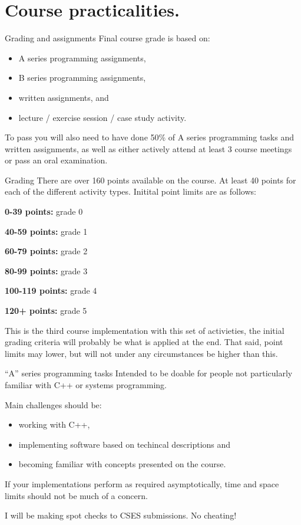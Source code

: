 \documentclass[11pt, aspectratio=169, table]{beamer}
\begin{document}
\section{Course practicalities.}
\begin{frame}{Grading and assignments}
\setlength\parskip{\fill}
Final course grade is based on:
\begin{itemize}
	\item A series programming assignments,
	\item B series programming assignments,
	\item written assignments, and
	\item lecture / exercise session / case study activity.
\end{itemize}

To pass you will also need to have done 50\% of A series programming tasks and written 
assignments, as well as either actively attend at least 3 course meetings or pass an oral 
examination.
\end{frame}

\begin{frame}{Grading}
There are over 160 points available on the course. At least 40 points for each of the different
activity types. Initital point limits are as follows:
\begin{description}
\item{{\bf 0-39 points:}} grade 0
\item{{\bf 40-59 points:}} grade 1
\item{{\bf 60-79 points:}} grade 2
\item{{\bf 80-99 points:}} grade 3
\item{{\bf 100-119 points:}} grade 4
\item{{\bf 120+ points:}} grade 5
\end{description}

This is the third course implementation with this set of activieties, the initial grading criteria 
will probably be what is applied at the end. That said, point limits may lower, but will not under any 
circumstances be higher than this.
\end{frame}

\begin{frame}{``A'' series programming tasks}
\setlength\parskip{\fill}
Intended to be doable for people not particularly familiar with C++ or systems programming.

Main challenges should be:
\begin{itemize}
	\item working with C++,
	\item implementing software based on techincal descriptions and
	\item becoming familiar with concepts presented on the course.
\end{itemize}

If your implementations perform as required asymptotically, time and space limits should not be much of a concern.

I will be making spot checks to CSES submissions. No cheating!
\end{frame}
\end{document}
